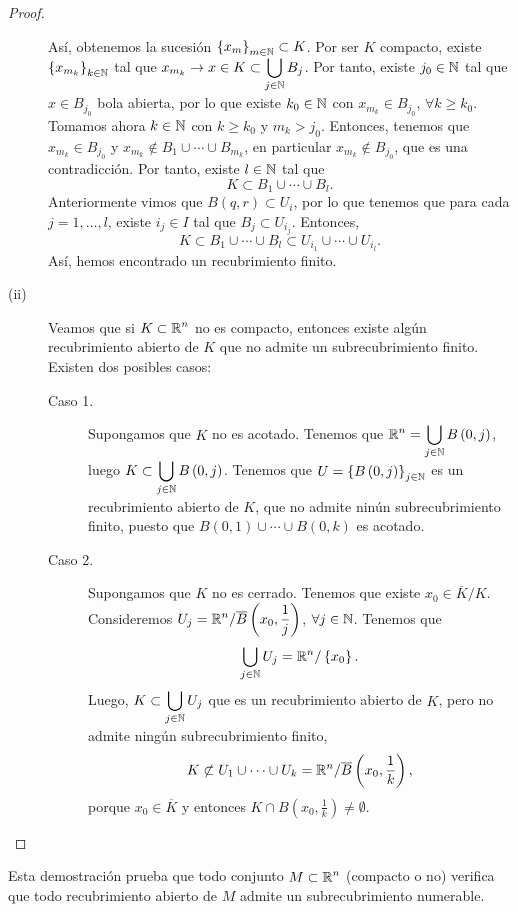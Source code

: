 \begin{proof}
\begin{description}
\begin{itemize}
		\end{itemize}
		Así, obtenemos la sucesión $\displaystyle \left\{ x_{m}\right\} _{m\in\mathbb{N}} \subset K $. Por ser $\displaystyle K $ compacto, existe $\displaystyle \left\{ x_{m_{k}}\right\} _{k \in \mathbb{N}} $ tal que $\displaystyle x_{m_{k}} \to x \in K \subset \bigcup_{j \in \mathbb{N}}B_{j} $. 
Por tanto, existe $\displaystyle j_{0} \in \mathbb{N} $ tal que $\displaystyle x \in B_{j_{0}} $ bola abierta, por lo que existe $\displaystyle k_{0} \in \mathbb{N} $ con $\displaystyle x_{m_{k}} \in B_{j_{0}} $, $\displaystyle \forall k \geq k_{0} $.
Tomamos ahora $\displaystyle k \in \mathbb{N} $ con $\displaystyle k \geq k_{0} $ y $\displaystyle m_{k} > j_{0} $. Entonces, tenemos que $\displaystyle x_{m_{k}} \in B_{j_{0}} $ y $\displaystyle x_{m_{k}} \not\in B_{1} \cup \cdots \cup B_{m_{k}} $, en particular $\displaystyle x_{m_{k}} \not\in B_{j_{0}} $, que es una contradicción. 
Por tanto, existe $\displaystyle l \in \mathbb{N} $ tal que 
\[K \subset B_{1} \cup \cdots \cup B_{l} .\]
Anteriormente vimos que $\displaystyle  B\left(q,r\right) \subset U_{i} $, por lo que tenemos que para cada $\displaystyle j = 1, \ldots, l $, existe $\displaystyle i_{j} \in I $ tal que $\displaystyle B_{j} \subset U_{i_{j}} $. Entonces, 
\[K \subset B_{1} \cup \cdots \cup B_{l} \subset U_{i_{1}} \cup \cdots \cup U_{i_{l}} .\]
Así, hemos encontrado un recubrimiento finito.
\item[(ii)] Veamos que si $\displaystyle K \subset \mathbb{R}^{n} $ no es compacto, entonces existe algún recubrimiento abierto de $\displaystyle K $ que no admite un subrecubrimiento finito. Existen dos posibles casos:
	\begin{description}
		\item[Caso 1.] Supongamos que $\displaystyle K $ no es acotado. Tenemos que $\displaystyle \mathbb{R}^{n} = \bigcup_{j \in \mathbb{N}}B\left(0,j\right) $, luego $\displaystyle K \subset \bigcup_{j \in \mathbb{N}}B\left(0,j\right) $. Tenemos que $\displaystyle U = \left\{ B\left(0,j\right)\right\} _{j \in \mathbb{N}} $ es un recubrimiento abierto de $\displaystyle K $, que no admite ninún subrecubrimiento finito, puesto que $\displaystyle B\left(0,1\right) \cup \cdots \cup B\left(0,k\right) $ es acotado. 
		\item[Caso 2.] Supongamos que $\displaystyle K $ no es cerrado. Tenemos que existe $\displaystyle x_{0} \in \overline{K}/K $. Consideremos $\displaystyle U_{j} = \mathbb{R}^{n} / \overline{B}\left(x_{0}, \frac{1}{j}\right) $, $\displaystyle \forall j \in \mathbb{N} $. Tenemos que
			\[\bigcup_{ j \in \mathbb{N}}U_{j} = \mathbb{R}^{n} / \left\{ x_{0}\right\}  .\]
	Luego, $\displaystyle K \subset \bigcup_{j \in \mathbb{N}}U_{j} $ que es un recubrimiento abierto de $\displaystyle K $, pero no admite ningún subrecubrimiento finito,
	\[ K \not\subset U_{1} \cup \cdots \cup U_{k} = \mathbb{R}^{n} / \overline{B}\left(x_{0}, \frac{1}{k}\right)  ,\]
	porque $\displaystyle x_{0} \in \overline{K} $ y entonces $\displaystyle K \cap B\left(x_{0}, \frac{1}{k}\right)\neq \emptyset $.
	\end{description}
\end{description}
\end{proof}
\begin{observation}
Esta demostración prueba que todo conjunto $\displaystyle M \subset \mathbb{R}^{n} $ (compacto o no) verifica que todo recubrimiento abierto de $\displaystyle M $ admite un subrecubrimiento numerable. 
\end{observation}

